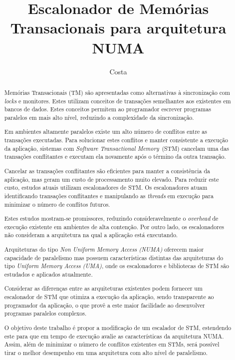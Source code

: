 \documentclass[diss-proposta,nocipinfo]{texufpel}
\title{Escalonador de Memórias Transacionais para arquitetura NUMA}
\author{Costa}{Michael Alexandre}
\begin{document}
\maketitle
\sloppy

\begin{abstract}

  Memórias Transacionais (TM) são apresentadas como alternativas à sincronização com \emph{locks} e monitores. Estes utilizam conceitos de transações semelhantes aos existentes em bancos de dados. Estes conceitos permitem ao programador escrever programas paralelos em mais alto nível, reduzindo a complexidade da sincronização.

  Em ambientes altamente paralelos existe um alto número de conflitos entre as transações executadas. Para solucionar estes conflitos e manter consistente a execução da aplicação, sistemas com \emph{Software Transactional Memory}~(STM) cancelam uma das transações conflitantes e executam ela novamente após o término da outra transação.

  Cancelar as transações conflitantes são eficientes para manter a consistência da aplicação, mas geram um custo de processamento muito elevado. Para reduzir este custo, estudos atuais utilizam escalonadores de STM. Os escalonadores atuam identificando transações conflitantes e manipulando as \emph{threads} em execução para minimizar o número de conflitos futuros.

  Estes estudos mostram-se promissores, reduzindo consideravelmente o \emph{overhead} de execução existente em ambientes de alta contenção. Por outro lado, os escalonadores não consideram a arquitetura na qual a aplicação está executando.

  Arquiteturas do tipo \emph{Non Uniform Memory Access (NUMA)} oferecem maior capacidade de paralelismo mas possuem características distintas das arquiteturas do tipo \emph{Uniform Memory Access (UMA)}, onde os escalonadores e bibliotecas de STM são estudados e aplicados atualmente.

  Considerar as diferenças entre as arquiteturas existentes podem fornecer um escalonador de STM que otimiza a execução da aplicação, sendo transparente ao programador da aplicação, o que provê a este maior facilidade ao desenvolver programas paralelos complexos.

  O objetivo deste trabalho é propor a modificação de um escalador de STM, estendendo este para que em tempo de execução avalie as características da arquitetura NUMA. Assim, além de minimizar o número de conflitos existentes em STMs, será possível tirar o melhor desempenho em uma arquitetura com alto nível de paralelismo.

\end{abstract}
\end{document}
